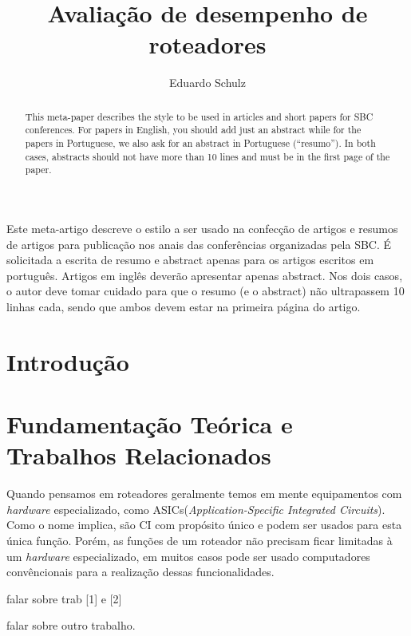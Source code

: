 \documentclass[12pt]{article}
\title{Avaliação de desempenho de roteadores}
\author{Eduardo Schulz\inst{1}}
\begin{document}
 

\maketitle

\begin{abstract}
  This meta-paper describes the style to be used in articles and short papers
  for SBC conferences. For papers in English, you should add just an abstract
  while for the papers in Portuguese, we also ask for an abstract in
  Portuguese (``resumo''). In both cases, abstracts should not have more than
  10 lines and must be in the first page of the paper.
\end{abstract}
     
\begin{resumo} 
  Este meta-artigo descreve o estilo a ser usado na confecção de artigos e
  resumos de artigos para publicação nos anais das conferências organizadas
  pela SBC. É solicitada a escrita de resumo e abstract apenas para os artigos
  escritos em português. Artigos em inglês deverão apresentar apenas abstract.
  Nos dois casos, o autor deve tomar cuidado para que o resumo (e o abstract)
  não ultrapassem 10 linhas cada, sendo que ambos devem estar na primeira
  página do artigo.
\end{resumo}


\section{Introdução}


\section{Fundamentação Teórica e Trabalhos Relacionados}

Quando pensamos em roteadores geralmente temos em mente equipamentos com \textit{hardware} especializado, como ASICs(\textit{Application-Specific Integrated Circuits}). Como o nome implica, são \ac{CI} com propósito único e podem ser usados para esta única função. Porém, as funções de um roteador não precisam ficar limitadas à um \textit{hardware} especializado, em muitos casos pode ser usado computadores convêncionais para a realização dessas funcionalidades.

falar sobre trab [1] e [2]

falar sobre outro trabalho.

\end{document}
